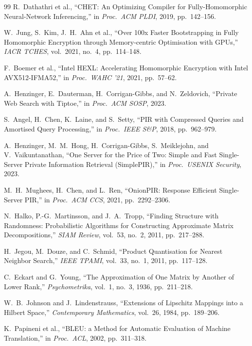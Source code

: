 \begin{thebibliography}{99}
 R.\ Dathathri et al., ``CHET: An Optimizing Compiler
for Fully-Homomorphic Neural-Network Inferencing,'' in
\emph{Proc.\ ACM PLDI}, 2019, pp.\ 142--156.

 W.\ Jung, S.\ Kim, J.\ H.\ Ahn et al.,
``Over 100x Faster Bootstrapping in Fully Homomorphic Encryption
through Memory-centric Optimisation with GPUs,'' \emph{IACR TCHES},
vol.\ 2021, no.\ 4, pp.\ 114--148.

 F.\ Boemer et al., ``Intel HEXL: Accelerating
Homomorphic Encryption with Intel AVX512-IFMA52,'' in
\emph{Proc.\ WAHC '21}, 2021, pp.\ 57--62.

 A.\ Henzinger, E.\ Dauterman, H.\ Corrigan-Gibbs,
and N.\ Zeldovich, ``Private Web Search with Tiptoe,'' in
\emph{Proc.\ ACM SOSP}, 2023.

 S.\ Angel, H.\ Chen, K.\ Laine, and S.\ Setty,
``PIR with Compressed Queries and Amortised Query Processing,'' in
\emph{Proc.\ IEEE S\&P}, 2018, pp.\ 962--979.

 A.\ Henzinger, M.\ M.\ Hong, H.\ Corrigan-Gibbs,
S.\ Meiklejohn, and V.\ Vaikuntanathan, ``One Server for the Price of
Two: Simple and Fast Single-Server Private Information Retrieval
(SimplePIR),'' in \emph{Proc.\ USENIX Security}, 2023.

 M.\ H.\ Mughees, H.\ Chen, and L.\ Ren,
``OnionPIR: Response Efficient Single-Server PIR,'' in
\emph{Proc.\ ACM CCS}, 2021, pp.\ 2292--2306.

 N.\ Halko, P.-G.\ Martinsson, and J.\ A.\ Tropp,
``Finding Structure with Randomness: Probabilistic Algorithms for
Constructing Approximate Matrix Decompositions,'' \emph{SIAM Review},
vol.\ 53, no.\ 2, 2011, pp.\ 217--288.

 H.\ Jegou, M.\ Douze, and C.\ Schmid, ``Product
Quantisation for Nearest Neighbor Search,'' \emph{IEEE TPAMI},
vol.\ 33, no.\ 1, 2011, pp.\ 117--128.

 C.\ Eckart and G.\ Young, ``The Approximation of
One Matrix by Another of Lower Rank,'' \emph{Psychometrika}, vol.\ 1,
no.\ 3, 1936, pp.\ 211--218.

 W.\ B.\ Johnson and J.\ Lindenstrauss, ``Extensions
of Lipschitz Mappings into a Hilbert Space,'' \emph{Contemporary
Mathematics}, vol.\ 26, 1984, pp.\ 189--206.

 K.\ Papineni et al., ``BLEU: a Method for Automatic
Evaluation of Machine Translation,'' in \emph{Proc.\ ACL}, 2002,
pp.\ 311--318.


\end{thebibliography}
